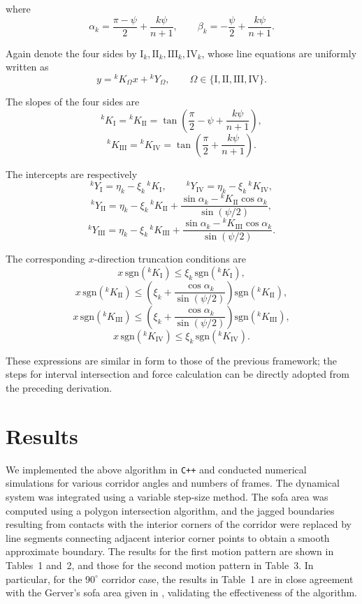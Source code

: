 \documentclass[12pt,a4paper]{article}
\theoremstyle{remark} %
\begin{document}
where
\[
\alpha_k=\frac{\pi-\psi}{2}+\frac{k\psi}{n+1},
\qquad
\beta_k=-\frac{\psi}{2}+\frac{k\psi}{n+1}.
\]

Again denote the four sides by $\mathrm I_k,\mathrm{II}_k,\mathrm{III}_k,\mathrm{IV}_k$, whose line equations are uniformly written as
\[
y={}^{k}K_\Omega x+{}^{k}Y_\Omega,
\qquad
\Omega\in\{\mathrm I,\mathrm{II},\mathrm{III},\mathrm{IV}\}.
\]

The slopes of the four sides are
\[
{}^{k}K_{\mathrm I}
={}^kK_{\mathrm{II}}
=\tan\!\left(
\frac{\pi}{2}-\psi+\frac{k\psi}{n+1}
\right),
\]
\[
{}^{k}K_{\mathrm{III}}
={}^kK_{\mathrm{IV}}
=\tan\!\left(
\frac{\pi}{2}+\frac{k\psi}{n+1}
\right).
\]

The intercepts are respectively
\[
{}^{k}Y_{\mathrm I}
=\eta_k-\xi_k\,{}^{k}K_{\mathrm I},
\qquad
{}^{k}Y_{\mathrm{IV}}
=\eta_k-\xi_k\,{}^{k}K_{\mathrm{IV}},
\]
\[
{}^{k}Y_{\mathrm{II}}
=\eta_k-\xi_k\,{}^{k}K_{\mathrm{II}}
+\frac{
\sin\alpha_k-{}^{k}K_{\mathrm{II}}\cos\alpha_k
}{
\sin(\psi/2)
},
\]
\[
{}^{k}Y_{\mathrm{III}}
=\eta_k-\xi_k\,{}^{k}K_{\mathrm{III}}
+\frac{
\sin\alpha_k-{}^{k}K_{\mathrm{III}}\cos\alpha_k
}{
\sin(\psi/2)
}.
\]

The corresponding $x$-direction truncation conditions are
\[
x\,\mathrm{sgn}({}^{k}K_{\mathrm I})
\le
\xi_k\,\mathrm{sgn}({}^{k}K_{\mathrm I}),
\]
\[
x\,\mathrm{sgn}({}^{k}K_{\mathrm{II}})
\le
\left(
\xi_k+\frac{\cos\alpha_k}{\sin(\psi/2)}
\right)
\mathrm{sgn}({}^{k}K_{\mathrm{II}}),
\]
\[
x\,\mathrm{sgn}({}^{k}K_{\mathrm{III}})
\le
\left(
\xi_k+\frac{\cos\alpha_k}{\sin(\psi/2)}
\right)
\mathrm{sgn}({}^{k}K_{\mathrm{III}}),
\]
\[
x\,\mathrm{sgn}({}^{k}K_{\mathrm{IV}})
\le
\xi_k\,\mathrm{sgn}({}^{k}K_{\mathrm{IV}}).
\]

These expressions are similar in form to those of the previous framework; the steps for interval intersection and force calculation can be directly adopted from the preceding derivation.

\section{Results}

We implemented the above algorithm in \texttt{C++} and conducted numerical simulations for various corridor angles and numbers of frames. The dynamical system was integrated using a variable step-size method. The sofa area was computed using a polygon intersection algorithm, and the jagged boundaries resulting from contacts with the interior corners of the corridor were replaced by line segments connecting adjacent interior corner points to obtain a smooth approximate boundary. The results for the first motion pattern are shown in Tables~1 and~2, and those for the second motion pattern in Table~3. In particular, for the $90^\circ$ corridor case, the results in Table~1 are in close agreement with the Gerver's sofa area given in \cite{Gerver1992}, validating the effectiveness of the algorithm.
\end{document}
